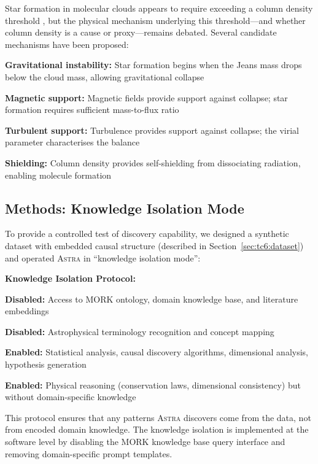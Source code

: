 \documentclass[usenatbib]{rasti}
\newcommand{\astra}{\textsc{Astra}\xspace}
\begin{document}
Star formation in molecular clouds appears to require exceeding a column density threshold \citep{Andre2010}, but the physical mechanism underlying this threshold---and whether column density is a cause or proxy---remains debated.
Several candidate mechanisms have been proposed:
\begin{description}
  \item \textbf{Gravitational instability:} Star formation begins when the Jeans mass drops below the cloud mass, allowing gravitational collapse
  \item \textbf{Magnetic support:} Magnetic fields provide support against collapse; star formation requires sufficient mass-to-flux ratio
  \item \textbf{Turbulent support:} Turbulence provides support against collapse; the virial parameter characterises the balance
  \item \textbf{Shielding:} Column density provides self-shielding from dissociating radiation, enabling molecule formation
\end{description}

\subsection{Methods: Knowledge Isolation Mode}
\label{sec:tc6:methods}

To provide a controlled test of discovery capability, we designed a synthetic dataset with embedded causal structure (described in Section~\ref{sec:tc6:dataset}) and operated \astra in ``knowledge isolation mode'':

\textbf{Knowledge Isolation Protocol:}
\begin{description}
  \item \textbf{Disabled:} Access to MORK ontology, domain knowledge base, and literature embeddings
  \item \textbf{Disabled:} Astrophysical terminology recognition and concept mapping
  \item \textbf{Enabled:} Statistical analysis, causal discovery algorithms, dimensional analysis, hypothesis generation
  \item \textbf{Enabled:} Physical reasoning (conservation laws, dimensional consistency) but without domain-specific knowledge
\end{description}

This protocol ensures that any patterns \astra discovers come from the data, not from encoded domain knowledge.
The knowledge isolation is implemented at the software level by disabling the MORK knowledge base query interface and removing domain-specific prompt templates.
\end{document}
